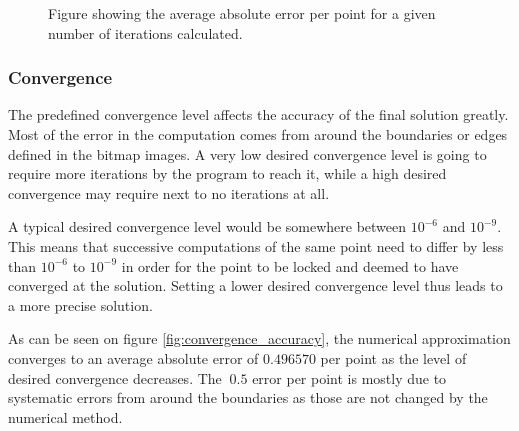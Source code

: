 \begin{figure}[h!]
\centering
\setlength\fboxsep{0pt}
\setlength\fboxrule{0.5pt}
\label{fig:iterations_vs_accuracy}
\caption{Figure showing the average absolute error per point for a given number of iterations calculated.}
\end{figure}

\subsubsection{Convergence}
The predefined convergence level affects the accuracy of the final solution greatly. Most of the error in the computation comes from around the boundaries or edges defined in the bitmap images. A very low desired convergence level is going to require more iterations by the program to reach it, while a high desired convergence may require next to no iterations at all. 

A typical desired convergence level would be somewhere between $10^{-6}$ and $10^{-9}$. This means that successive computations of the same point need to differ by less than $10^{-6}$ to $10^{-9}$ in order for the point to be locked and deemed to have converged at the solution. Setting a lower desired convergence level thus leads to a more precise solution. 

As can be seen on figure \ref{fig:convergence_accuracy}, the numerical approximation converges to an average absolute error of $0.496570$ per point as the level of desired convergence decreases. The $~0.5$ error per point is mostly due to systematic errors from around the boundaries as those are not changed by the numerical method. 

